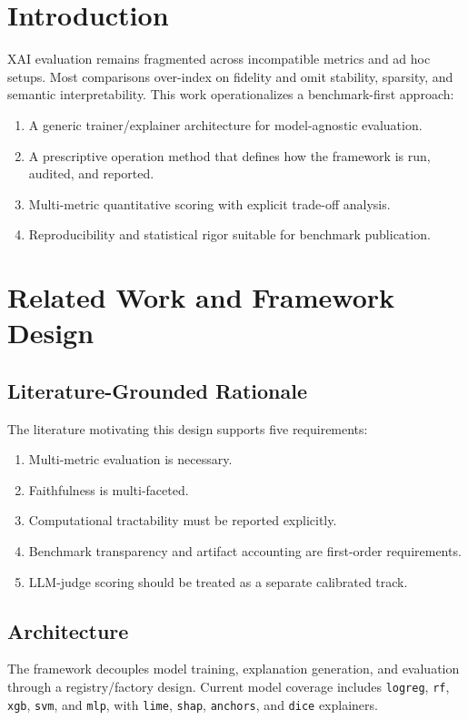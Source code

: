 \documentclass[twoside,11pt]{article}
\begin{document}
\section{Introduction}
XAI evaluation remains fragmented across incompatible metrics and ad hoc setups. Most comparisons over-index on fidelity and omit stability, sparsity, and semantic interpretability. This work operationalizes a benchmark-first approach:
\begin{enumerate}[leftmargin=*]
    \item A generic trainer/explainer architecture for model-agnostic evaluation.
    \item A prescriptive operation method that defines how the framework is run, audited, and reported.
    \item Multi-metric quantitative scoring with explicit trade-off analysis.
    \item Reproducibility and statistical rigor suitable for benchmark publication.
\end{enumerate}

\section{Related Work and Framework Design}

\subsection{Literature-Grounded Rationale}
The literature motivating this design supports five requirements:
\begin{enumerate}[leftmargin=*]
    \item Multi-metric evaluation is necessary.
    \item Faithfulness is multi-faceted.
    \item Computational tractability must be reported explicitly.
    \item Benchmark transparency and artifact accounting are first-order requirements.
    \item LLM-judge scoring should be treated as a separate calibrated track.
\end{enumerate}

\subsection{Architecture}
The framework decouples model training, explanation generation, and evaluation through a registry/factory design. Current model coverage includes \texttt{logreg}, \texttt{rf}, \texttt{xgb}, \texttt{svm}, and \texttt{mlp}, with \texttt{lime}, \texttt{shap}, \texttt{anchors}, and \texttt{dice} explainers.
\end{document}
